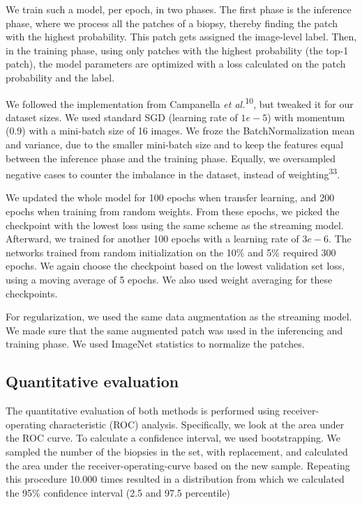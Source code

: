 \documentclass[
  12pt,
  a5,margin=2cmpaper,
]{article}
\begin{document}
We train such a model, per epoch, in two phases. The first phase is the
inference phase, where we process all the patches of a biopsy, thereby
finding the patch with the highest probability. This patch gets assigned
the image-level label. Then, in the training phase, using only patches
with the highest probability (the top-1 patch), the model parameters are
optimized with a loss calculated on the patch probability and the label.

We followed the implementation from Campanella \emph{et
al.}\textsuperscript{10}, but tweaked it for our dataset sizes. We used
standard SGD (learning rate of \(1e-5\)) with momentum (0.9) with a
mini-batch size of 16 images. We froze the BatchNormalization mean and
variance, due to the smaller mini-batch size and to keep the features
equal between the inference phase and the training phase. Equally, we
oversampled negative cases to counter the imbalance in the dataset,
instead of weighting\textsuperscript{33}.

We updated the whole model for 100 epochs when transfer learning, and
200 epochs when training from random weights. From these epochs, we
picked the checkpoint with the lowest loss using the same scheme as the
streaming model. Afterward, we trained for another 100 epochs with a
learning rate of \(3e-6\). The networks trained from random
initialization on the 10\% and 5\% required 300 epochs. We again choose
the checkpoint based on the lowest validation set loss, using a moving
average of 5 epochs. We also used weight averaging for these
checkpoints.

For regularization, we used the same data augmentation as the streaming
model. We made sure that the same augmented patch was used in the
inferencing and training phase. We used ImageNet statistics to normalize
the patches.

\hypertarget{quantitative-evaluation}{%
\subsection{Quantitative evaluation}\label{quantitative-evaluation}}

The quantitative evaluation of both methods is performed using
receiver-operating characteristic (ROC) analysis. Specifically, we look
at the area under the ROC curve. To calculate a confidence interval, we
used bootstrapping. We sampled the number of the biopsies in the set,
with replacement, and calculated the area under the
receiver-operating-curve based on the new sample. Repeating this
procedure 10.000 times resulted in a distribution from which we
calculated the 95\% confidence interval (2.5 and 97.5 percentile)
\end{document}
